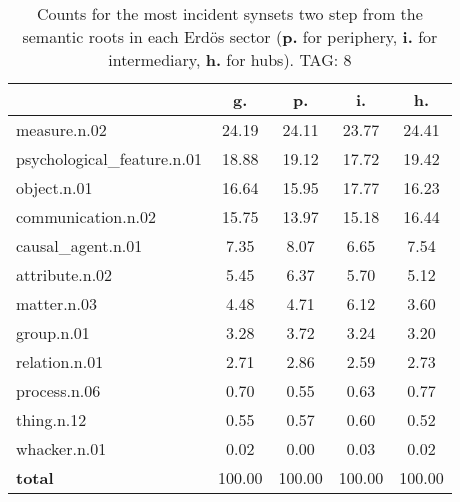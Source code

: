 \begin{table}[h!]
\begin{center}
\begin{tabular}{| l || c | c | c | c |}\hline
 & {\bf g.} & {\bf p.} & {\bf i.} & {\bf h.} \\\hline\hline
measure.n.02 & 24.19  & 24.11  & 23.77  & 24.41 \\\hline
psychological\_feature.n.01 & 18.88  & 19.12  & 17.72  & 19.42 \\\hline
object.n.01 & 16.64  & 15.95  & 17.77  & 16.23 \\\hline
communication.n.02 & 15.75  & 13.97  & 15.18  & 16.44 \\\hline
causal\_agent.n.01 & 7.35  & 8.07  & 6.65  & 7.54 \\\hline
attribute.n.02 & 5.45  & 6.37  & 5.70  & 5.12 \\\hline
matter.n.03 & 4.48  & 4.71  & 6.12  & 3.60 \\\hline
group.n.01 & 3.28  & 3.72  & 3.24  & 3.20 \\\hline
relation.n.01 & 2.71  & 2.86  & 2.59  & 2.73 \\\hline
process.n.06 & 0.70  & 0.55  & 0.63  & 0.77 \\\hline
thing.n.12 & 0.55  & 0.57  & 0.60  & 0.52 \\\hline
whacker.n.01 & 0.02  & 0.00  & 0.03  & 0.02 \\\hline\hline
{{\bf total}} & 100.00  & 100.00  & 100.00  & 100.00 \\\hline
\end{tabular}
\caption{Counts for the most incident synsets two step from the semantic roots in each Erd\"os sector ({\bf p.} for periphery, {\bf i.} for intermediary, {\bf h.} for hubs). TAG: 8}
\end{center}
\end{table}